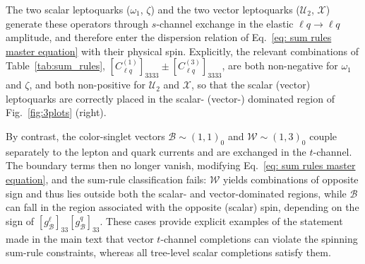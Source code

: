 \documentclass[
aps,
prd,
10pt,
twocolumn,
oneside,
preprintnumbers,
superscriptaddress,
amsmath,
amssymb,
nofootinbib,
flushbottom]{revtex4-2}
\begin{document}
The two scalar leptoquarks ($\omega_1$, $\zeta$) and the two vector leptoquarks
($\mathcal{U}_2$, $\mathcal{X}$) generate these operators through $s$-channel
exchange in the elastic $\ell q \to \ell q$ amplitude, and therefore enter the
dispersion relation of Eq.~\eqref{eq: sum rules master equation} with their physical
spin. Explicitly, the relevant combinations of Table~\ref{tab:sum_rules},
$[C_{\ell q}^{(1)}]_{3333} \pm [C_{\ell q}^{(3)}]_{3333}$, are both non-negative for
$\omega_1$ and $\zeta$, and both non-positive for $\mathcal{U}_2$ and $\mathcal{X}$,
so that the scalar (vector) leptoquarks are correctly placed in the scalar-
(vector-) dominated region of Fig.~\ref{fig:3plots} (right).

By contrast, the color-singlet vectors $\mathcal{B} \sim (1,1)_0$ and
$\mathcal{W} \sim (1,3)_0$ couple separately to the lepton and quark currents and are exchanged in the $t$-channel. The boundary terms then no longer vanish, modifying Eq.~\eqref{eq: sum rules master equation}, and the sum-rule
classification fails: $\mathcal{W}$ yields combinations of opposite sign and thus
lies outside both the scalar- and vector-dominated regions, while $\mathcal{B}$ can
fall in the region associated with the opposite (scalar) spin, depending on the sign
of $[g_{\mathcal B}^\ell]_{33}[g_{\mathcal B}^q]_{33}$. These cases provide explicit
examples of the statement made in the main text that vector $t$-channel completions
can violate the spinning sum-rule constraints, whereas all tree-level scalar
completions satisfy them.


 
\end{document}
